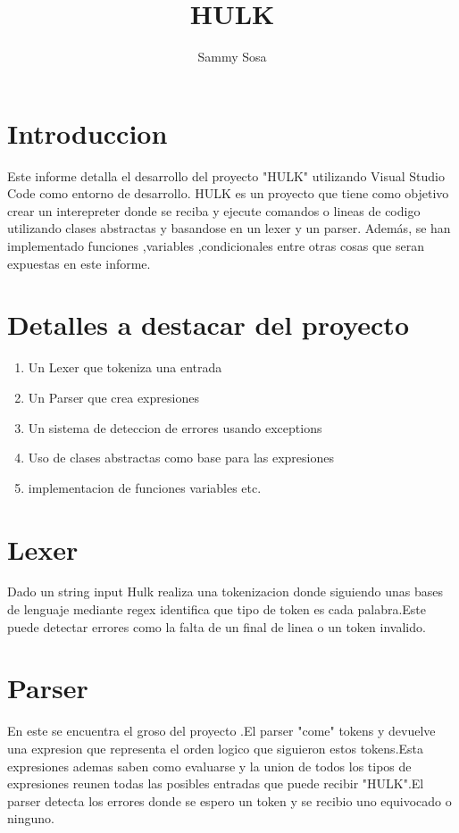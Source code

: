 \documentclass{article}
\author{Sammy Sosa}
\title{HULK}
\begin{document}
\maketitle


\section{Introduccion} 
Este informe detalla el desarrollo del proyecto "HULK" utilizando Visual Studio Code como entorno de desarrollo. HULK es un proyecto que tiene como objetivo crear un interepreter donde se reciba y ejecute comandos o lineas de codigo utilizando clases abstractas y basandose en un lexer y un parser. Además, se han implementado funciones ,variables ,condicionales entre otras cosas que seran expuestas en este informe.


\section{Detalles a destacar del proyecto}
\begin{enumerate}
  \item Un Lexer que tokeniza una entrada
  \item Un Parser que crea expresiones
  \item Un sistema de deteccion de errores usando exceptions
  \item Uso de clases abstractas como base para las expresiones
  \item implementacion de funciones variables etc.
\end{enumerate}


\newpage 
\section*{Lexer}
Dado un string input Hulk realiza una tokenizacion donde siguiendo unas bases de lenguaje mediante regex identifica que tipo de token es cada palabra.Este puede detectar errores como la falta de un final de linea o un token invalido.

\newpage 
\section*{Parser}
En este se encuentra el groso del proyecto .El parser "come" tokens y devuelve una expresion que representa el orden logico que siguieron estos tokens.Esta expresiones ademas saben como evaluarse y la union de todos los tipos de expresiones reunen todas las posibles entradas que puede recibir "HULK".El parser detecta los errores donde se espero un token y se recibio uno equivocado o ninguno.
\end{document}
